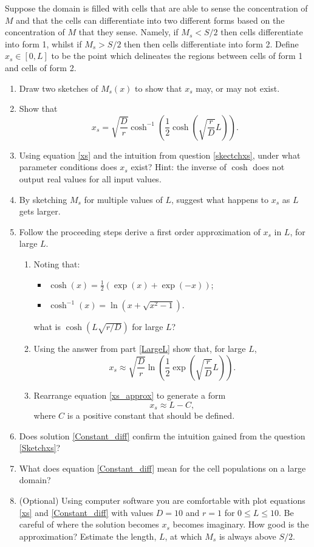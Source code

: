 \documentclass[10pt]{article}
\newcommand{\bb}{\begin{equation}}
\newcommand{\ee}{\end{equation}}
\newcommand{\eqn}[1]{equation \eqref{#1}}
\newcommand{\eqns}[2]{equations \eqref{#1} and \eqref{#2}}
\renewcommand{\l}{\left(}
\renewcommand{\r}{\right)}
\newcounter{Counter1}
\begin{document}
Suppose the domain is filled with cells that are able to sense the concentration of $M$ and that the cells can differentiate into two different forms based on the concentration of $M$ that they sense. Namely, if $M_s<S/2$ then cells differentiate into form 1, whilst if $M_s>S/2$ then then cells differentiate into form 2. Define $x_s\in[0,L]$ to be the point which delineates the regions between cells of form 1 and cells of form 2.
\begin{enumerate}
\setcounter{enumi}{\value{Counter1}}
\item Draw two sketches of $M_s(x)$ to show that $x_s$ may, or may not exist.\label{skectchxs}

\item Show that
\bb
x_s=\sqrt{\frac{D}{r}}\cosh^{-1}\l\frac{1}{2}\cosh\l\sqrt{\frac{r}{D}}L\r \r.\label{xs}
\ee

\item Using \eqn{xs} and the intuition from question \ref{skectchxs}, under what parameter conditions does $x_s$ exist?  Hint: the inverse of  $\cosh$ does not output real values for all input values.

\item By sketching $M_s$ for multiple values of $L$, suggest what happens to $x_s$ as $L$ gets larger.\label{Sketchxs}

\item Follow the proceeding steps derive a first order approximation of $x_s$ in $L$, for large $L$.
\begin{enumerate}
\item Noting that: 
\begin{itemize}
\item $\cosh(x)=\frac{1}{2}\l\exp(x)+\exp(-x)\r$;
\item $\cosh^{-1}(x)=\ln\l x+\sqrt{x^2-1}\r.$
\end{itemize}
what is $\cosh\l L\sqrt{r/D}\r$ for large $L$?\label{LargeL}

\item Using the answer from part \ref{LargeL} show that, for large $L$,
\bb
x_s\approx\sqrt{\frac{D}{r}}\ln\l\frac{1}{2}\exp\l{\sqrt{\frac{r}{D}}L}\r\r.\label{xs_approx}
\ee
\item Rearrange \eqn{xs_approx} to generate a form
\bb
x_s\approx L-C,\label{Constant_diff}
\ee
where $C$ is a positive constant that should be defined.
\end{enumerate}


\item Does solution \eqref{Constant_diff} confirm the intuition gained from the question \ref{Sketchxs}?

\item What does \eqn{Constant_diff} mean for the cell populations on a large domain?

\item (Optional) Using computer software you are comfortable with plot \eqns{xs}{Constant_diff} with values $D=10$ and $r=1$ for $0\leq L \leq 10$. Be careful of where the solution becomes $x_s$ becomes imaginary. How good is the approximation? Estimate the length, $L$, at which $M_s$ is always above $S/2$.
\end{enumerate}
\end{document}
